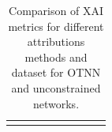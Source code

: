 \begin{table}[]
\begin{tabular}{lllllllll}
\rowcolor[HTML]{EFEFEF} 
\end{tabular}
  \caption{Comparison of XAI metrics for different attributions methods and dataset for OTNN and unconstrained networks.}
\label{table:xaimetric}
\end{table}